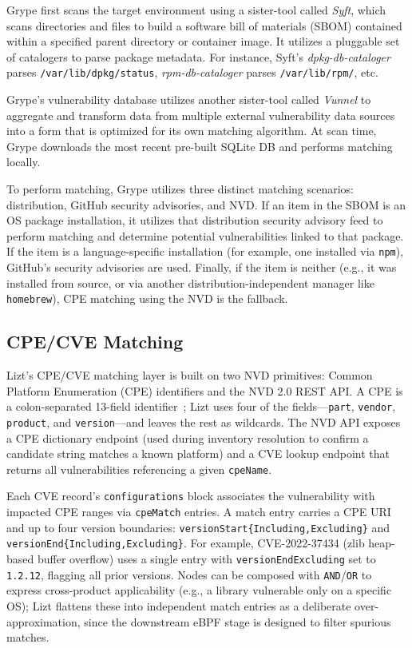 \documentclass[conference]{IEEEtran}
\begin{document}
Grype first scans the target environment using a sister-tool called \textit{Syft}, which scans directories and files to build a software bill of materials (SBOM) contained within a specified parent directory or container image.
It utilizes a pluggable set of catalogers to parse package metadata.
For instance, Syft's \textit{dpkg-db-cataloger} parses \texttt{/var/lib/dpkg/status}, \textit{rpm-db-cataloger} parses \texttt{/var/lib/rpm/}, etc.

Grype's vulnerability database utilizes another sister-tool called \textit{Vunnel} to aggregate and transform data from multiple external vulnerability data sources into a form that is optimized for its own matching algorithm.
At scan time, Grype downloads the most recent pre-built SQLite DB and performs matching locally.

To perform matching, Grype utilizes three distinct matching scenarios: distribution, GitHub security advisories, and NVD.
If an item in the SBOM is an OS package installation, it utilizes that distribution security advisory feed to perform matching and determine potential vulnerabilities linked to that package.
If the item is a language-specific installation (for example, one installed via \texttt{npm}), GitHub's security advisories are used.
Finally, if the item is neither (e.g., it was installed from source, or via another distribution-independent manager like \texttt{homebrew}), CPE matching using the NVD is the fallback.

\subsection{CPE/CVE Matching}

Lizt's CPE/CVE matching layer is built on two NVD primitives: Common Platform Enumeration (CPE) identifiers and the NVD 2.0 REST API.
A CPE is a colon-separated 13-field identifier~\cite{cpe_spec}; Lizt uses four of the fields---\texttt{part}, \texttt{vendor}, \texttt{product}, and \texttt{version}---and leaves the rest as wildcards.
The NVD API exposes a CPE dictionary endpoint (used during inventory resolution to confirm a candidate string matches a known platform) and a CVE lookup endpoint that returns all vulnerabilities referencing a given \texttt{cpeName}.

Each CVE record's \texttt{configurations} block associates the vulnerability with impacted CPE ranges via \texttt{cpeMatch} entries.
A match entry carries a CPE URI and up to four version boundaries: \texttt{versionStart\{Including,Excluding\}} and \texttt{versionEnd\{Including,Excluding\}}.
For example, CVE-2022-37434 (zlib heap-based buffer overflow) uses a single entry with \texttt{versionEndExcluding} set to \texttt{1.2.12}, flagging all prior versions.
Nodes can be composed with \texttt{AND}/\texttt{OR} to express cross-product applicability (e.g., a library vulnerable only on a specific OS); Lizt flattens these into independent match entries as a deliberate over-approximation, since the downstream eBPF stage is designed to filter spurious matches.
\end{document}

